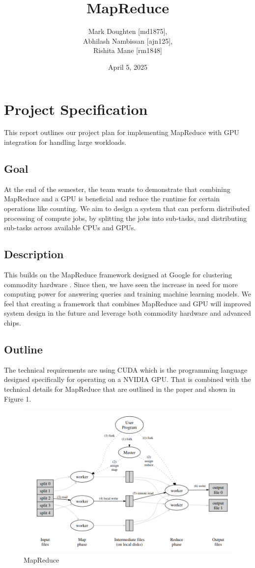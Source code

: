 \documentclass{article}
\title{MapReduce}
\author{Mark Doughten [md1875], \\
Abhilash Nambissan [ajn125], \\
Rishita Mane [rm1848]}
\date{April 5, 2025}
\begin{document}
\maketitle
\section{Project Specification}

This report outlines our project plan for implementing MapReduce with GPU integration for handling large workloads.

\subsection{Goal}
At the end of the semester, the team wants to demonstrate that combining MapReduce and a GPU is beneficial and reduce the runtime for certain operations like counting. We aim to design a system that can perform distributed processing of compute jobs, by splitting the jobs into sub-tasks, and distributing sub-tasks across available CPUs and GPUs.

\subsection{Description}
This builds on the MapReduce framework designed at Google for clustering commodity hardware \cite{mapreduce}. Since then, we have seen the increase in need for more computing power for answering queries and training machine learning models. We feel that creating a framework that combines MapReduce and GPU will improved system design in the future and leverage both commodity hardware and advanced chips. 

\subsection{Outline}
The technical requirements are using CUDA which is the programming language designed specifically for operating on a NVIDIA GPU. That is combined with the technical details for MapReduce that are outlined in the paper \cite{mapreduce} and shown in Figure 1. 

\begin{figure}[ht]
    \centering
    \includegraphics[width=1\linewidth]{./images/mapreduce.png}
    \caption{MapReduce \cite{mapreduce}}
    \label{fig:chroot}
\end{figure}
\end{document}
